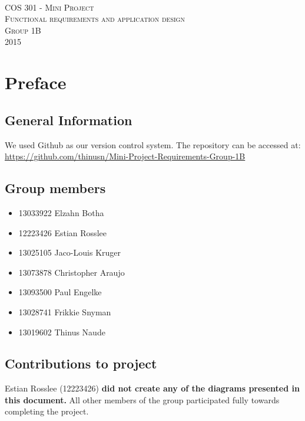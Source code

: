 \documentclass [a4paper,12pt] {article}
\begin{document}
\begin{titlepage}
	\begin{center}
		\textsc{\huge\\[5cm] COS 301 - Mini Project}\\[1cm]
		\textsc{\huge Functional requirements and application design}\\[1cm]
		\textsc{\huge Group 1B}\\[1cm]
		\textsc{\large 2015}
	\end{center}
\end{titlepage}
\tableofcontents
\pagebreak
\section{Preface}
	\subsection{General Information}
	We used Github as our version control system. The repository can be accessed at: \linebreak \url{https://github.com/thinusn/Mini-Project-Requirements-Group-1B}
	\subsection{Group members}
	\begin{itemize}
		\item 13033922 Elzahn Botha
		\item 12223426 Estian Rosslee
		\item 13025105 Jaco-Louis Kruger
		\item 13073878 Christopher Araujo
		\item 13093500 Paul Engelke
		\item 13028741 Frikkie Snyman
		\item 13019602 Thinus Naude
	\end{itemize}
	\subsection{Contributions to project} 
		Estian Rosslee (12223426) \textbf{did not create any of the diagrams presented in this document.} All other members of the group participated fully towards completing the project.
\end{document}
